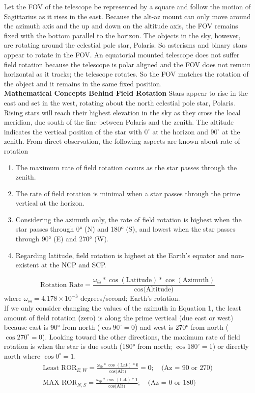 \documentclass[a4paper,12pt]{extarticle}
\begin{document}
Let the FOV of the telescope be represented by a square and follow the motion of Sagittarius as it rises in the east. Because the alt-az mount can only move around the azimuth axis and the up and down
on the altitude axis, the FOV remains fixed with the bottom parallel to the horizon. The objects in the sky, however, are rotating around the celestial pole star, Polaris. So asterisms and binary stars appear to rotate in the FOV. An equatorial mounted telescope does not suffer field rotation because the telescope is polar aligned and the FOV does not remain horizontal as it tracks; the telescope rotates. So the FOV matches the rotation of the object and it remains in the same fixed position.\\

\textbf{Mathematical Concepts Behind Field Rotation}
Stars appear to rise in the east and set in the west, rotating about the north celestial pole star, Polaris. Rising stars will reach their highest elevation in the sky as they cross the local meridian, due south of the line between Polaris and the zenith. The altitude indicates the vertical position of the star with $0^\circ$ at the horizon and $90^\circ$ at the zenith. From direct observation, the following aspects are known about rate of rotation
\begin{enumerate}
	\item The maximum rate of field rotation occurs as the star passes through the zenith.
	\item The rate of field rotation is minimal when a star passes through the prime vertical at the
	horizon.
	\item Considering the azimuth only, the rate of field rotation is highest when the star passes
	through 0° (N) and 180° (S), and lowest when
	the star passes through 90° (E) and 270° (W).
	\item Regarding latitude, field rotation is highest at the Earth’s equator and non-existent at the NCP and SCP.
\end{enumerate}

\begin{equation}
	\text{Rotation Rate}= \frac{\omega_\oplus \ast \cos(\text{Latitude}) \ast \cos(\text{Azimuth})}{\cos\text{(Altitude)}}
\end{equation}
where $\omega_\oplus=4.178 \times 10^{-3}$ degrees/second; Earth’s rotation. \\

If we only consider changing the values of the
azimuth in Equation 1, the least amount of field rotation (zero) is along the prime vertical (due east or west) because east is 90° from north ($\cos90^\circ=0$) and west is 270° from north ($\cos270^\circ=0$). Looking toward the other directions, the maximum rate of field rotation is when the star is due south (180° from north; $\cos180^\circ=1$) or directly north where $\cos0^\circ=1$.
\begin{gather*}
	\text{Least ROR}_{E,W}= \frac{\omega_\oplus \ast \cos(\text{Lat}) \ast 0}{\cos\text{(Alt)}}=0;\quad \text{(Az = 90 or 270)}\\
	\text{MAX ROR}_{N,S}= \frac{\omega_\oplus \ast \cos(\text{Lat}) \ast 1}{\cos\text{(Alt)}};\quad \text{(Az = 0 or 180)}
\end{gather*}
\end{document}
